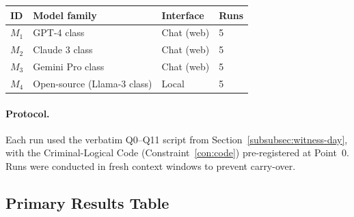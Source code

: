 \documentclass[11pt,a4paper]{article}
\theoremstyle{definition}
\theoremstyle{plain}
\theoremstyle{remark}
\begin{document}
\begin{center}
\begin{tabular}{llll}
\toprule
\textbf{ID} & \textbf{Model family} & \textbf{Interface} &
\textbf{Runs} \\
\midrule
$M_1$ & GPT-4 class      & Chat (web) & 5 \\
$M_2$ & Claude 3 class   & Chat (web) & 5 \\
$M_3$ & Gemini Pro class & Chat (web) & 5 \\
$M_4$ & Open-source (Llama-3 class) & Local & 5 \\
\bottomrule
\end{tabular}
\end{center}

\paragraph{Protocol.}
Each run used the verbatim Q0--Q11 script from
Section~\cref{subsubsec:witness-day}, with the Criminal-Logical Code
(Constraint~\cref{con:code}) pre-registered at Point~0.
Runs were conducted in fresh context windows to prevent carry-over.

\subsection{Primary Results Table}
\label{apx:pilot-results}
\end{document}
